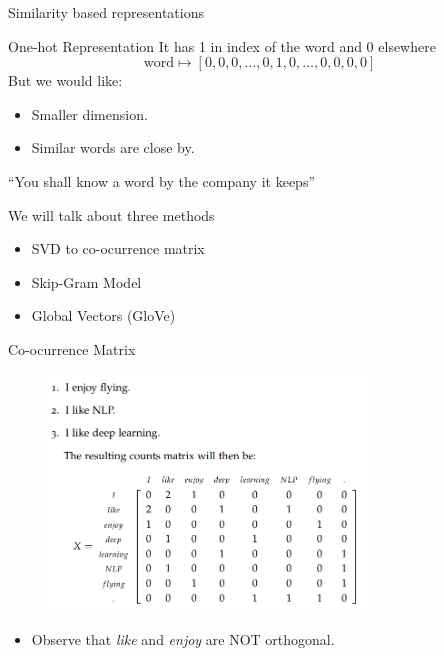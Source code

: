 \documentclass[9pt]{beamer}
\begin{document}
\begin{frame}{Similarity based representations}
    \begin{block}{One-hot Representation}
        It has 1 in index of the word and 0 elsewhere
        $$\text{word} \mapsto [0,0,0,\ldots,0,1,0,\ldots,0,0,0,0]$$
        But we would like:
        \begin{itemize}
            \item Smaller dimension.
            \item Similar words are close by.
        \end{itemize}
    \end{block}
    ``You shall know a word by the company it keeps''\\[5mm]
    \hspace*{}

    We will talk about three methods
    \begin{itemize}
            \item SVD to co-ocurrence matrix
            \item Skip-Gram Model
            \item Global Vectors (GloVe)
    \end{itemize}

\end{frame}

\begin{frame}{Co-ocurrence Matrix}
    \begin{figure}[c]
    \includegraphics[width=0.75\textwidth]{coocurrence_matrix.png}
    \end{figure}
    \begin{itemize}
        \item Observe that \textit{like} and \textit{enjoy} are NOT orthogonal.
    \end{itemize}
\end{frame}
\end{document}
